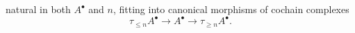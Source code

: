\begin{definition}
\begin{enumerate}
    natural in both $A^\bullet$ and $n$, fitting into canonical morphisms of cochain complexes
    $$
    \tau_{\le n} A^\bullet \longrightarrow A^\bullet \longrightarrow \tau_{\ge n} A^\bullet.
    $$

    \end{enumerate}






\end{definition}